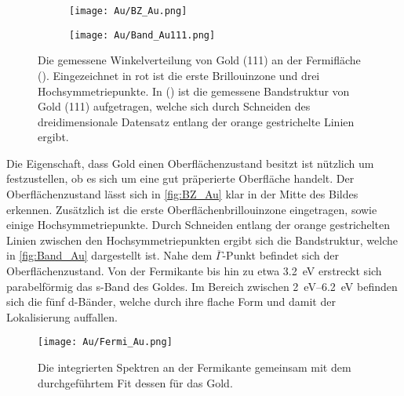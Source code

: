         \begin{figure}
            \centering
            \begin{subfigure}[t]{0.34\textwidth}
                \centering
                \texttt{[image: Au/BZ\_Au.png]}
                \subcaption{}
                \label{fig:BZ_Au}
            \end{subfigure}
            \begin{subfigure}[t]{0.62\textwidth}
                \centering
                \texttt{[image: Au/Band\_Au111.png]}
                \subcaption{}
                \label{fig:Band_Au}
            \end{subfigure}
            \caption{Die gemessene Winkelverteilung von Gold (111) an der Fermifläche ().
            Eingezeichnet in rot ist die erste Brillouinzone und drei Hochsymmetriepunkte.
            In () ist die gemessene Bandstruktur von Gold (111) aufgetragen, welche sich durch Schneiden des dreidimensionale Datensatz entlang der orange gestrichelte Linien ergibt.}
        \end{figure}
        Die Eigenschaft, dass Gold einen Oberflächenzustand besitzt ist nützlich um festzustellen, ob es sich um eine gut präperierte Oberfläche handelt.
        Der Oberflächenzustand lässt sich in \autoref{fig:BZ_Au} klar in der Mitte des Bildes erkennen.
        Zusätzlich ist die erste Oberflächenbrillouinzone eingetragen, sowie einige Hochsymmetriepunkte.
        Durch Schneiden entlang der orange gestrichelten Linien zwischen den Hochsymmetriepunkten ergibt sich die Bandstruktur, welche in \autoref{fig:Band_Au} dargestellt ist.
        Nahe dem $\overline{\Gamma}$-Punkt befindet sich der Oberflächenzustand.
        Von der Fermikante bis hin zu etwa \SI{3.2}{\electronvolt} erstreckt sich parabelförmig das s-Band des Goldes.
        Im Bereich zwischen \SIrange{2}{6.2}{\electronvolt} befinden sich die fünf d-Bänder, welche durch ihre flache Form und damit der Lokalisierung auffallen.

        \begin{figure}
            \centering
            \texttt{[image: Au/Fermi\_Au.png]}
            \caption{Die integrierten Spektren an der Fermikante gemeinsam mit dem durchgeführtem Fit dessen für das Gold.}
            \label{fig:Fermi_Au}
        \end{figure}

